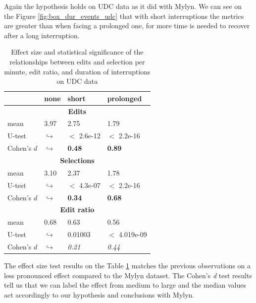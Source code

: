 \documentclass[times]{smrauth}
\begin{document}
Again the hypothesis holds on UDC data as it did with Mylyn. We can see on the Figure \ref{fig:box_dur_events_udc} that with short interruptions the metrics are greater than when facing a prolonged one, for more time is needed to recover after a long interruption. 
\begin{table}[ht!]
\tiny
\renewcommand{\arraystretch}{1.3}
\caption{Effect size and statistical significance of the relationships between edits and selection per minute, edit ratio, and duration of interruptions on UDC data} %
\label{tbl:p_value2_udc}
\centering
\begin{tabular}{l | p{0.7cm} | p{1.9cm} | p{1.9cm} } 
   & none & short &  prolonged  \\  
  \hline
  \multicolumn{4}{c}{\textbf{Edits}} \\
  \hline
  mean & 3.97 &	2.75 & 1.79 \\ 
   \cline{3-4} 
  U-test & $\hookrightarrow$ &  $<$ 2.6e-12 & $<$ 2.2e-16  \\

  \cline{3-4} 
  Cohen's $d$ & $\hookrightarrow$	& \textbf{0.48} & \textbf{0.89}   \\
  \hline
  
  
  \multicolumn{4}{c}{\textbf{Selections}} \\
  \hline 
  mean & 3.10 &	2.37 & 1.78 \\ 
   \cline{3-4} 
  U-test & $\hookrightarrow$ & $<$ 4.3e-07& $<$ 2.2e-16  \\
  
  \cline{3-4} 
  Cohen's $d$ & $\hookrightarrow$	& \textbf{0.34} & \textbf{0.68}  \\  
  \hline
  \multicolumn{4}{c}{\textbf{Edit ratio}} \\
  \hline 
  mean & 0.68 & 0.63 & 0.56\\ 
   \cline{3-4} 
  U-test & $\hookrightarrow$ & 0.01003 & $<$ 4.019e-09  \\
  \cline{3-4} 
  Cohen's $d$ & $\hookrightarrow$ & \textit{0.21} & \textit{0.44}\\
\hline

\end{tabular}
\end{table}
The effect size test results on the Table \ref{tbl:p_value2_udc} matches the previous observations on a less pronounced effect compared to the Mylyn dataset. The Cohen's \textit{d} test results tell us that we can label the effect from medium to large and the median values act accordingly to our hypothesis and conclusions with Mylyn.
\end{document}
